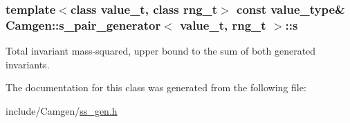 \subsubsection[{s}]{\setlength{\rightskip}{0pt plus 5cm}template$<$class value\+\_\+t, class rng\+\_\+t$>$ const value\+\_\+type\& {\bf Camgen\+::s\+\_\+pair\+\_\+generator}$<$ value\+\_\+t, rng\+\_\+t $>$\+::s}\label{a00495_adbd0b9bca10903e6ab2d660d8646a526}


Total invariant mass-\/squared, upper bound to the sum of both generated invariants. 



The documentation for this class was generated from the following file\+:\begin{DoxyCompactItemize}
\item 
include/\+Camgen/\hyperlink{a00785}{ss\+\_\+gen.\+h}\end{DoxyCompactItemize}
